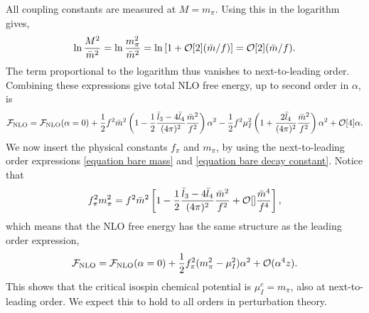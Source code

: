 %
All coupling constants are measured at $M = m_\pi$.
Using this in the logarithm gives,
%
\begin{equation}
    \ln \frac{M^2}{\bar m^2}
    = \ln \frac{m_\pi^2}{\bar m^2}
    = \ln \left[1 + \mathcal O[2]{(\bar m/f)} \right]
    = \mathcal O[2]{(\bar m/f)}.
\end{equation}
%
The term proportional to the logarithm thus vanishes to next-to-leading order.
Combining these expressions give total NLO free energy, up to second order in $\alpha$, is
%
\begin{equation}
    \mathcal{F}_{\mathrm{NLO}}
    =
    \mathcal{F}_{\mathrm{NLO}}(\alpha = 0)
    +
    \frac{1}{2} f^2 \bar m^2
    \left(
        1
        -
        \frac{1}{2}
        \frac{\bar l_3 - 4 \bar l_4}{(4 \pi)^2} \frac{\bar m^2}{f^2}
    \right)\alpha^2
    - \frac{1}{2}f^2 \mu_I^2
    \left(
        1
        +
        \frac{2 \bar l_4}{(4 \pi)^2}
        \frac{\bar m^2}{f^2}
    \right) \alpha^2
    + \mathcal O[4]{\alpha}.
\end{equation}
%
We now insert the physical constants $f_\pi$ and $m_\pi$, by using the next-to-leading order expressions \autoref{equation bare mass} and \autoref{equation bare decay constant}.
Notice that
%
\begin{equation}
    f_\pi^2 m_\pi^2
    = f^2 \bar m^2
    \left[
        1 - \frac{1}{2} \frac{\bar l_3 - 4 \bar l_4}{(4 \pi)^2} \frac{\bar m^2}{f^2}
        +
        \mathcal O[]{\frac{\bar m^4}{f^4}}
    \right],
\end{equation}
%
which means that the NLO free energy has the same structure as the leading order expression,
%
\begin{equation}
    \mathcal{F}_{\mathrm{NLO}}
    =
    \mathcal{F}_{\mathrm{NLO}}(\alpha = 0)
    + \frac{1}{2}f_\pi^2 (m_\pi^2 - \mu_I^2 )\alpha^2
    + \mathcal O(\alpha^4z).
\end{equation}
%
This shows that the critical isospin chemical potential is $\mu_I^c = m_\pi$, also at next-to-leading order.
We expect this to hold to all orders in perturbation theory.
